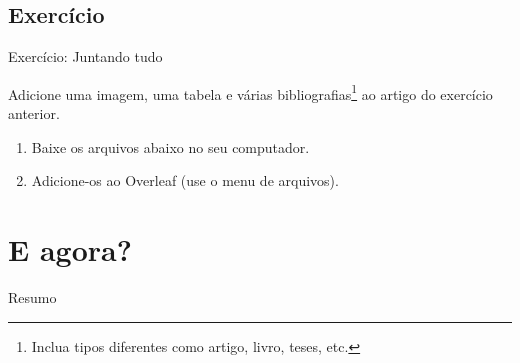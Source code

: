 \documentclass{beamer}
\begin{document}
\subsection{Exercício}
\begin{frame}[fragile]{Exercício: Juntando tudo}

Adicione uma imagem, uma tabela  e várias bibliografias\footnote{Inclua tipos diferentes como artigo, livro, teses, etc.} ao artigo do exercício anterior.

\begin{enumerate}
\item Baixe os arquivos abaixo no seu computador.

\begin{center}

\end{center}

\item Adicione-os ao  Overleaf (use o menu de arquivos).


\end{enumerate}
\end{frame}

\section{E agora?}

\begin{frame}{Resumo}
\begin{multicols}{2}
\tableofcontents[currentsection]
\end{multicols}
\end{frame}

\end{document}
